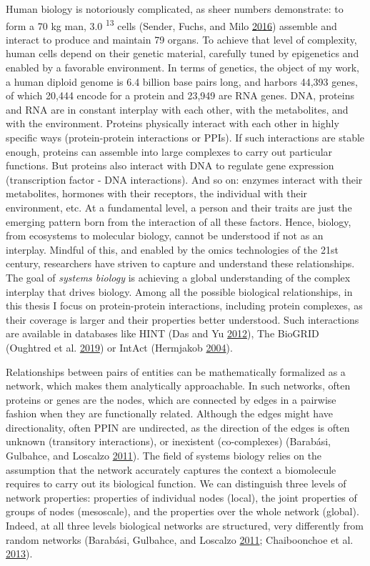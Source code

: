 \documentclass[
  11pt,
]{env/yjiao}
\begin{document}
Human biology is notoriously complicated, as sheer numbers demonstrate: to form a 70 kg man, 3.0 \textsuperscript{13} cells (Sender, Fuchs, and Milo \protect\hyperlink{ref-sender_revised_2016}{2016}) assemble and interact to produce and maintain 79 organs. To achieve that level of complexity, human cells depend on their genetic material, carefully tuned by epigenetics and enabled by a favorable environment. In terms of genetics, the object of my work, a human diploid genome is 6.4 billion base pairs long, and harbors 44,393 genes, of which 20,444 encode for a protein and 23,949 are RNA genes. DNA, proteins and RNA are in constant interplay with each other, with the metabolites, and with the environment. Proteins physically interact with each other in highly specific ways (protein-protein interactions or PPIs). If such interactions are stable enough, proteins can assemble into large complexes to carry out particular functions. But proteins also interact with DNA to regulate gene expression (transcription factor - DNA interactions). And so on: enzymes interact with their metabolites, hormones with their receptors, the individual with their environment, etc. At a fundamental level, a person and their traits are just the emerging pattern born from the interaction of all these factors. Hence, biology, from ecosystems to molecular biology, cannot be understood if not as an interplay. Mindful of this, and enabled by the omics technologies of the 21st century, researchers have striven to capture and understand these relationships. The goal of \emph{systems biology} is achieving a global understanding of the complex interplay that drives biology. Among all the possible biological relationships, in this thesis I focus on protein-protein interactions, including protein complexes, as their coverage is larger and their properties better understood. Such interactions are available in databases like HINT (Das and Yu \protect\hyperlink{ref-das_hint_2012}{2012}), The BioGRID (Oughtred et al. \protect\hyperlink{ref-oughtred_biogrid_2019}{2019}) or IntAct (Hermjakob \protect\hyperlink{ref-hermjakob_intact_2004}{2004}).

Relationships between pairs of entities can be mathematically formalized as a network, which makes them analytically approachable. In such networks, often proteins or genes are the nodes, which are connected by edges in a pairwise fashion when they are functionally related. Although the edges might have directionality, often PPIN are undirected, as the direction of the edges is often unknown (transitory interactions), or inexistent (co-complexes) (Barabási, Gulbahce, and Loscalzo \protect\hyperlink{ref-barabasi_network_2011}{2011}). The field of systems biology relies on the assumption that the network accurately captures the context a biomolecule requires to carry out its biological function. We can distinguish three levels of network properties: properties of individual nodes (local), the joint properties of groups of nodes (mesoscale), and the properties over the whole network (global). Indeed, at all three levels biological networks are structured, very differently from random networks (Barabási, Gulbahce, and Loscalzo \protect\hyperlink{ref-barabasi_network_2011}{2011}; Chaiboonchoe et al. \protect\hyperlink{ref-Chaiboonchoe2013}{2013}).
\end{document}
